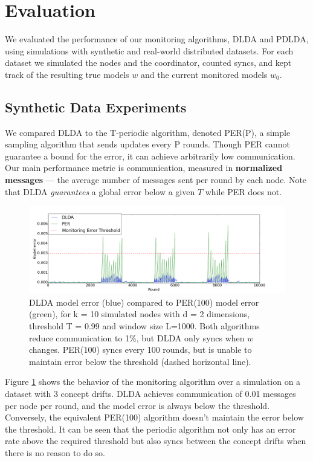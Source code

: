 \documentclass[11pt,twocolumn,varwidth=true,a4paper,fleqn]{article}
\begin{document}
\section{Evaluation}
We evaluated the performance of our monitoring algorithms,
DLDA and PDLDA, using simulations with synthetic and real-world 
distributed datasets. For each dataset we simulated the nodes and the coordinator, 
counted syncs, and kept track of the resulting true models $w$ and the
current monitored models $w_0$. 
\subsection{Synthetic Data Experiments}
We compared DLDA to the T-periodic algorithm, denoted
PER(P), a simple sampling algorithm that sends updates
every P rounds. Though PER cannot guarantee a bound for the
error, it can achieve arbitrarily low communication.
Our main performance metric is communication, measured
in \textbf{normalized messages} --- the average number of messages sent per
round by each node. Note that DLDA \textit{guarantees}
a global error below a given $T$ while PER does not.

\begin{figure}[ht]
	\centering
	\includegraphics[width=\textwidth]{PER/PERvsDLDAoverTime.png}
	\caption{ DLDA model error (blue) compared to PER(100) model error (green), 
	for k = 10 simulated nodes with d = 2 dimensions, threshold T = 0.99 and
	window size L=1000. Both algorithms reduce communication to 1\%, but DLDA
	only syncs when $w$ changes. PER(100) syncs every 100 rounds, 
	but is unable to maintain error below the threshold (dashed horizontal line).}
	\label{PERvsDLDAoverTime}
\end{figure}
	
Figure \ref{PERvsDLDAoverTime} shows the behavior of the monitoring 
algorithm over a simulation on a dataset with 3 concept drifts. 
DLDA achieves communication of 0.01 messages per node per round, and 
the model error is always below the threshold. 
Conversely, the equivalent PER(100) algorithm doesn't maintain the
error below the threshold. It can be seen that the periodic algorithm 
not only has an error rate above the required threshold but also
syncs between the concept drifts when there is no reason to do so.
\end{document}
